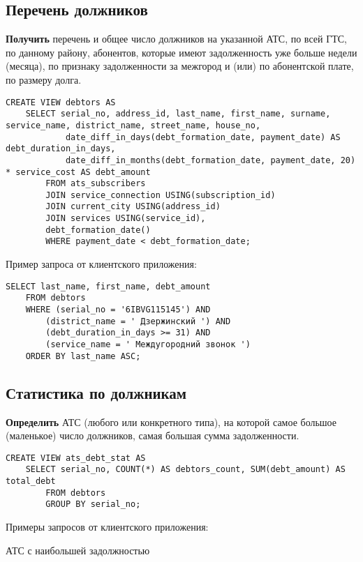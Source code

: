 \documentclass{report}
\begin{document}
\subsection{Перечень должников}

\textbf{Получить} перечень и общее число должников на указанной АТС, 
по всей ГТС, по данному району, абонентов, которые имеют задолженность 
уже больше недели (месяца), по признаку задолженности за межгород и (или) 
по абонентской плате, по размеру долга.

\begin{lstlisting}
CREATE VIEW debtors AS
    SELECT serial_no, address_id, last_name, first_name, surname, service_name, district_name, street_name, house_no,
            date_diff_in_days(debt_formation_date, payment_date) AS debt_duration_in_days,
            date_diff_in_months(debt_formation_date, payment_date, 20) * service_cost AS debt_amount
        FROM ats_subscribers
        JOIN service_connection USING(subscription_id)
        JOIN current_city USING(address_id)
        JOIN services USING(service_id),
        debt_formation_date()
        WHERE payment_date < debt_formation_date;
\end{lstlisting}

Пример запроса от клиентского приложения:

\begin{lstlisting}
SELECT last_name, first_name, debt_amount
	FROM debtors
	WHERE (serial_no = '6IBVG115145') AND
		(district_name = ' Дзержинский ') AND
		(debt_duration_in_days >= 31) AND
		(service_name = ' Междугородний звонок ')
	ORDER BY last_name ASC;
\end{lstlisting}

\subsection{Статистика по должникам}

\textbf{Определить} АТС (любого или конкретного типа), на которой 
самое большое (маленькое) число должников, самая большая сумма задолженности.

\begin{lstlisting}
CREATE VIEW ats_debt_stat AS 
    SELECT serial_no, COUNT(*) AS debtors_count, SUM(debt_amount) AS total_debt 
        FROM debtors
        GROUP BY serial_no;  
\end{lstlisting}

Примеры запросов от клиентского приложения:

АТС с наибольшей задолжностью
\end{document}
